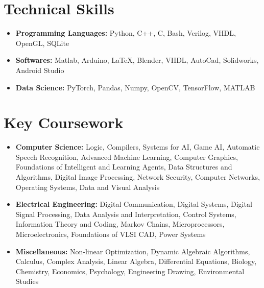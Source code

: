 \documentclass[10pt,letterpaper,sans]{moderncv}
\providecommand{\sl}{\slshape}
\begin{document}
\section{Technical Skills}
\vspace{3pt}
\begin{itemize}
\item \textbf{Programming Languages:} Python, C++, C, Bash, Verilog, VHDL, OpenGL, SQLite
\vspace{3pt}
\item \textbf{Softwares:} Matlab, Arduino, \LaTeX, Blender, VHDL, AutoCad, Solidworks, Android Studio
\vspace{3pt}
\item \textbf{Data Science:} PyTorch, Pandas, Numpy, OpenCV, TensorFlow, MATLAB
\end{itemize}
\vspace{-10pt}
\section{Key Coursework}
\vspace{3pt}
\begin{itemize}
\item \textbf{Computer Science:} Logic, Compilers, Systems for AI, Game AI, Automatic Speech Recognition, Advanced Machine Learning, Computer Graphics, Foundations of Intelligent and Learning Agents, Data Structures and Algorithms, Digital Image Processing, Network Security, Computer Networks, Operating Systems, Data and Visual Analysis
\vspace{3pt}
\item{\textbf{Electrical Engineering:} Digital Communication, Digital Systems, Digital Signal Processing, Data Analysis and Interpretation, Control Systems, Information Theory and Coding, Markov Chains, Microprocessors, Microelectronics, Foundations of VLSI CAD, Power Systems}
\vspace{3pt}
\item{\textbf{Miscellaneous:} Non-linear Optimization, Dynamic Algebraic Algorithms, Calculus, Complex Analysis, Linear Algebra, Differential Equations, Biology, Chemistry, Economics, Psychology, Engineering Drawing, Environmental Studies}
\end{itemize}
\vspace{-10pt}
\end{document}
